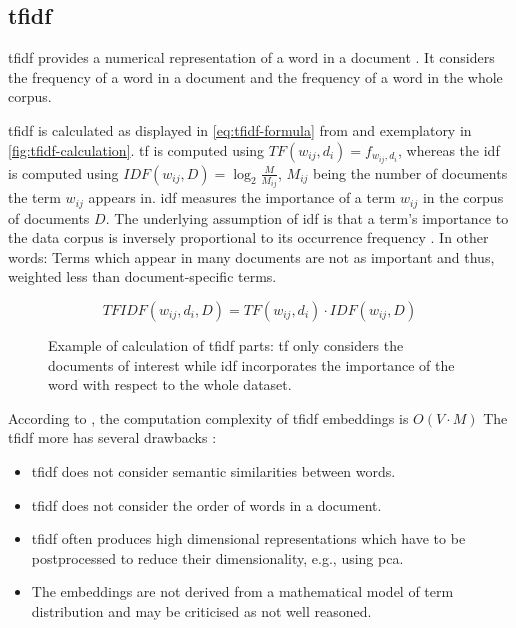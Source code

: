 \subsection{\ac{tfidf}}\label{subsec:tfidf}

\ac{tfidf} provides a numerical representation of a word in a document \cite{clusteringDocs2020}.
It considers the frequency of a word in a document and the frequency of a word in the whole corpus. 

\ac{tfidf} is calculated as displayed in \autoref{eq:tfidf-formula} from \cite{clusteringDocs2020} and exemplatory in \autoref{fig:tfidf-calculation}.
\ac{tf} is computed using $TF(w_{ij}, d_i) = f_{w_{ij}, d_i}$, whereas the \ac{idf} is computed using $IDF(w_{ij}, D) = \log_2\frac{M}{M_{ij}}$, 
$M_{ij}$ being the number of documents the term $w_{ij}$ appears in.
\ac{idf} measures the importance of a term $w_{ij}$ in the corpus of documents $D$.
The underlying assumption of \ac{idf} is that a term's importance to the data corpus is inversely proportional to its occurrence frequency \cite{tfidf2008}.
In other words: Terms which appear in many documents are not as important and thus, weighted less than document-specific terms. 

\begin{equation}
    TFIDF(w_{ij}, d_i, D) = TF(w_{ij}, d_i) \cdot IDF(w_{ij}, D)
    \label{eq:tfidf-formula}
\end{equation}


\begin{figure}[htp] %
    \centering
    
    \caption{
        Example of calculation of \ac{tfidf} parts: 
        \ac{tf} only considers the documents of interest while 
        \ac{idf} incorporates the importance of the word with respect to the whole dataset.
    }
    \label{fig:tfidf-calculation}
\end{figure}

According to \citeauthor{tfidf2008}, the computation complexity of \ac{tfidf} embeddings is $O(V \cdot M)$
The \ac{tfidf} more has several drawbacks \cite{clusteringDocs2020,tfidf2008}:
\begin{itemize}
    \item \ac{tfidf} does not consider semantic similarities between words.
    \item \ac{tfidf} does not consider the order of words in a document.
    \item \ac{tfidf} often produces high dimensional representations which have to be postprocessed to reduce their dimensionality, e.g., using \ac{pca}.
    \item The embeddings are not derived from a mathematical model of term distribution and may be criticised as not well reasoned.
\end{itemize}